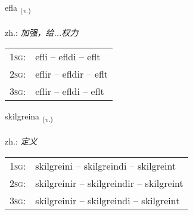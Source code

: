 \documentclass[frontgrid, backgrid]{flacards}\usepackage[]{graphicx}\usepackage[]{xcolor}
\begin{document}
\renewcommand{\flhead}{\vskip5pt \fboxsep=0pt {\small\bfseries\footnotesize Sagnorð | 动词}}
\renewcommand{\fcfoot}{\vskip5pt \fboxsep=0pt \hspace{2pt}{\small\bfseries\footnotesize 1K}}

\renewcommand{\blhead}{\vskip5pt {\small\bfseries\footnotesize Sagnorð | 动词 }}
\renewcommand{\bcfoot}{\vskip5pt \hspace{2pt}{\small\bfseries\footnotesize 1K}}


{efla \small{\textsubscript{(\textit{v.})}} \\[1ex] %
\textphonetic{[ɛpla]} \\
zh.: \emph{加强，给...权力} \\  [2ex]
\renewcommand*{\arraystretch}{0.8}
\begin{tabular}{p{1cm}l}
\textsc{1sg}: & efli -- efldi -- eflt \\ 
\textsc{2sg}: & eflir -- efldir -- eflt \\ 
\textsc{3sg}: & eflir -- efldi -- eflt \\ 
\end{tabular}
}

\renewcommand{\flhead}{\vskip5pt \fboxsep=0pt {\small\bfseries\footnotesize Sagnorð | 动词}}
\renewcommand{\fcfoot}{\vskip5pt \fboxsep=0pt \hspace{2pt}{\small\bfseries\footnotesize 1K}}

\renewcommand{\blhead}{\vskip5pt {\small\bfseries\footnotesize Sagnorð | 动词 }}
\renewcommand{\bcfoot}{\vskip5pt \hspace{2pt}{\small\bfseries\footnotesize 1K}}


{skilgreina \small{\textsubscript{(\textit{v.})}} \\[1ex] %
\textphonetic{[scɪlkreina]} \\
zh.: \emph{定义} \\  [2ex]
\renewcommand*{\arraystretch}{0.8}
\begin{tabular}{p{1cm}l}
\textsc{1sg}: & skilgreini -- skilgreindi -- skilgreint \\ 
\textsc{2sg}: & skilgreinir -- skilgreindir -- skilgreint \\ 
\textsc{3sg}: & skilgreinir -- skilgreindi -- skilgreint \\ 
\end{tabular}
}
\end{document}
